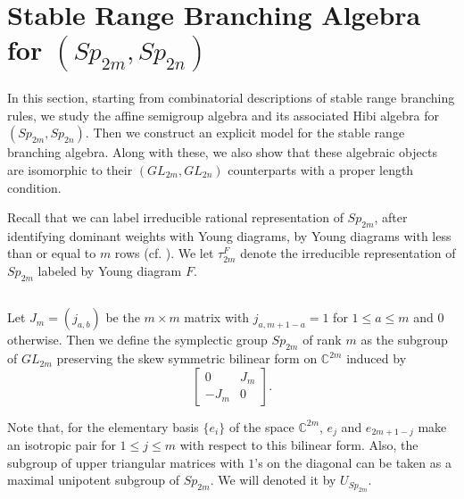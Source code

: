 \documentclass[11pt]{amsart}
\numberwithin{equation}{subsection}
\begin{document}
\medskip


\section{Stable Range Branching Algebra for $({Sp}_{2m},{Sp}_{2n})$}


In this section, starting from combinatorial descriptions of stable range branching rules, 
we study the affine semigroup algebra and its associated Hibi algebra for $({Sp}_{2m},{Sp}_{2n})$.
Then we construct an explicit model for the stable range branching algebra. Along with these,
we also show that these algebraic objects are isomorphic to their $(GL_{2m}, GL_{2n})$ counterparts 
with a proper length condition.

\smallskip

Recall that we can label irreducible rational representation of ${Sp}_{2m}$, after 
identifying dominant weights with Young diagrams, by Young diagrams with less than or equal
to $m$ rows (cf. \cite[\S 3.1.4]{GW09}). We let $\tau_{2m}^{F}$ denote the irreducible 
representation of ${Sp}_{2m}$ labeled by Young diagram $F$.


\subsection{}\label{sp-section1}

Let $J_{m}=(j_{a,b})$ be the $m\times m$ matrix with $j_{a,m+1-a}=1$ for 
$1\leq a\leq m$ and $0$ otherwise. Then we define the symplectic group 
${Sp}_{2m}$ of rank $m$ as the subgroup of ${GL}_{2m}$ preserving the skew
symmetric bilinear form on $\mathbb{C}^{2m}$ induced by 
\begin{equation*}
\left[ 
\begin{array}{cc}
0 & J_{m} \\ 
-J_{m} & 0
\end{array}
\right] .
\end{equation*}

Note that, for the elementary basis $\{e_{i}\}$ of the space $\mathbb{C}^{2m}$, 
$e_{j}$ and $e_{2m+1-j}$ make an isotropic pair for $1\leq j\leq m$ with respect 
to this bilinear form. Also, the subgroup of upper triangular matrices with $1$'s on 
the diagonal can be taken as a maximal unipotent subgroup of ${Sp}_{2m}$. We will
denoted it by $U_{{Sp}_{2m}}$.

\medskip
\end{document}
